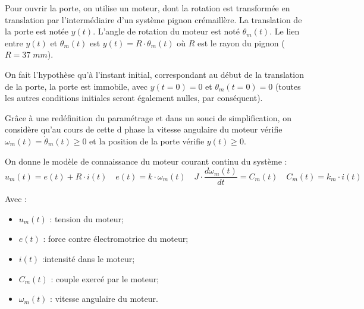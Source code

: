 Pour ouvrir la porte, on utilise un moteur, dont la rotation est transformée en translation par l'intermédiaire d'un système pignon crémaillère. La translation de la porte est notée $y(t)$. L'angle de rotation du moteur est noté $\theta_m(t)$. Le lien entre $y(t)$ et $\theta_m (t)$ est $y(t) = R\cdot\theta_m (t)$ où $R$ est le rayon du pignon ($R=37\; mm$).

On fait l'hypothèse qu'à l'instant initial, correspondant au début de la translation de la porte, la porte est immobile, avec $y(t=0)=0$ et $\theta_m (t=0)=0$ (toutes les autres conditions initiales seront également nulles, par conséquent).

Grâce à une redéfinition du paramétrage et dans un souci de simplification, on considère qu'au cours de cette d phase la vitesse angulaire du moteur vérifie $\omega_m (t) = \dot{\theta}_m (t) \geq 0$ et la position de la porte vérifie $y(t) \geq 0$.  


On donne le modèle de connaissance du moteur courant continu du système :
$$u_m(t) = e(t) + R\cdot i(t) 
\quad e(t) = k\cdot \omega_m(t) 
\quad J\cdot \dfrac{d\omega_m(t)}{dt} = C_m (t)
\quad C_m (t) = k_m \cdot i(t)$$

\vspace{0.5cm}
Avec : 
\begin{itemize}
\item $u_m (t)$ : tension du moteur; 
\item $e(t)$ : force contre électromotrice du moteur; 
\item $i(t)$ :intensité dans le moteur;
\item $C_m (t)$ : couple exercé par le moteur;
\item $\omega_m(t)$ : vitesse angulaire du moteur.
\end{itemize}

